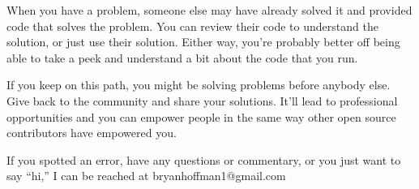 \documentclass[
]{book}
\begin{document}
When you have a problem, someone else may have already solved it and provided code that solves the problem. You can review their code to understand the solution, or just use their solution. Either way, you're probably better off being able to take a peek and understand a bit about the code that you run.

If you keep on this path, you might be solving problems before anybody else. Give back to the community and share your solutions. It'll lead to professional opportunities and you can empower people in the same way other open source contributors have empowered you.

If you spotted an error, have any questions or commentary, or you just want to say ``hi,'' I can be reached at bryanhoffman1@gmail.com

  
\end{document}
